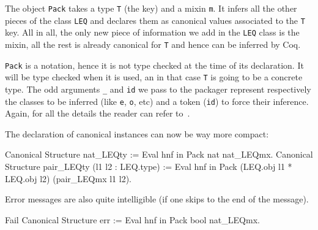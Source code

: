 The object \texttt{Pack} takes a type \texttt{T} (the key) and a mixin \texttt{m}.  It infers all
the other pieces of the class \texttt{LEQ} and declares them as canonical values
associated to the \texttt{T} key.  All in all, the only new piece of information
we add in the \texttt{LEQ} class is the mixin, all the rest is already canonical
for \texttt{T} and hence can be inferred by Coq.

\texttt{Pack} is a notation, hence it is not type checked at the time of its
declaration.  It will be type checked when it is used, an in that case
\texttt{T} is going to be a concrete type.  The odd arguments \texttt{\_} and \texttt{id} we
pass to the 
packager represent respectively the classes to be inferred (like \texttt{e}, \texttt{o}, etc) and a token (\texttt{id}) to force their inference.  Again, for all the details the
reader can refer to~\cite{CSwcu}. 

The declaration of canonical instances can now be way more compact:

\begin{coq_example}
Canonical Structure nat_LEQty := Eval hnf in Pack nat nat_LEQmx.
Canonical Structure pair_LEQty (l1 l2 : LEQ.type) :=
  Eval hnf in Pack (LEQ.obj l1 * LEQ.obj l2) (pair_LEQmx l1 l2).
\end{coq_example}

Error messages are also quite intelligible (if one skips to the end of
the message).

\begin{coq_example}
Fail Canonical Structure err := Eval hnf in Pack bool nat_LEQmx.
\end{coq_example}

